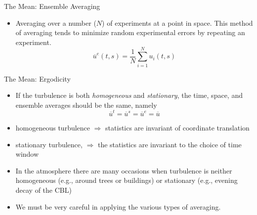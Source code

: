 
\begin{frame}{The Mean: Ensemble Averaging}

\begin{itemize}
	\item Averaging over a number ($N$) of experiments at a point in space. This method of averaging tends to minimize random experimental errors by repeating an experiment.
	$$\overline{u}^e(t,s) = \frac{1}{N}\sum^{N}_{i=1} u_i(t,s)$$
\end{itemize}
\end{frame}


\begin{frame}{The Mean: Ergodicity}

\begin{itemize}
	\item If the turbulence is both \textit{homogeneous} and \textit{stationary}, the time, space, and ensemble averages should be the same, namely
	$$\overline{u}^t=\overline{u}^s=\overline{u}^e=\overline{u}$$
	\item homogeneous turbulence $\Rightarrow$ statistics are invariant of coordinate translation
	\item stationary turbulence, $\Rightarrow$ the statistics are invariant to the choice of time window
	\item In the atmosphere there are many occasions when turbulence is neither homogeneous (e.g., around trees or buildings) or stationary (e.g., evening decay of the CBL)
	\item We must be very careful in applying the various types of averaging.
\end{itemize}
\end{frame}


